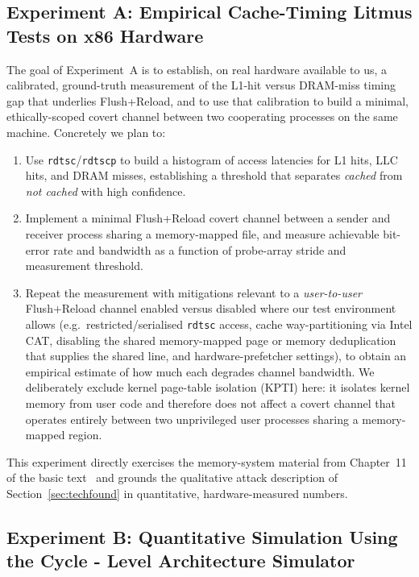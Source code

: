 \documentclass[11pt,a4paper]{article}
\begin{document}
\subsection{Experiment A: Empirical Cache-Timing Litmus Tests on x86 Hardware}
\label{sec:expA}

The goal of Experiment~A is to establish, on real hardware available to us, a
calibrated, ground-truth measurement of the L1-hit versus DRAM-miss timing gap
that underlies Flush+Reload, and to use that calibration to build a minimal,
ethically-scoped covert channel between two cooperating processes on the same
machine. Concretely we plan to:

\begin{enumerate}[nosep]
\item Use \texttt{rdtsc}/\texttt{rdtscp} to build a histogram of access
latencies for L1 hits, LLC hits, and DRAM misses, establishing a threshold
that separates \emph{cached} from \emph{not cached} with high confidence.
\item Implement a minimal Flush+Reload covert channel between a sender and
receiver process sharing a memory-mapped file, and measure achievable
bit-error rate and bandwidth as a function of probe-array stride and
measurement threshold.
\item Repeat the measurement with mitigations relevant to a \emph{user-to-user}
Flush+Reload channel enabled versus disabled where our test environment allows
(e.g.\ restricted/serialised \texttt{rdtsc} access, cache way-partitioning via
Intel CAT, disabling the shared memory-mapped page or memory deduplication that
supplies the shared line, and hardware-prefetcher settings), to obtain an
empirical estimate of how much each degrades channel bandwidth. We deliberately
exclude kernel page-table isolation (KPTI) here: it isolates kernel memory from
user code and therefore does not affect a covert channel that operates entirely
between two unprivileged user processes sharing a memory-mapped region.
\end{enumerate}

This experiment directly exercises the memory-system material from
Chapter~11 of the basic text~\cite{sarangi2025basic} and grounds the
qualitative attack description of Section~\ref{sec:techfound} in quantitative,
hardware-measured numbers.

\subsection{Experiment B: Quantitative Simulation Using the Cycle - Level Architecture Simulator}
\label{sec:expB}
\end{document}
